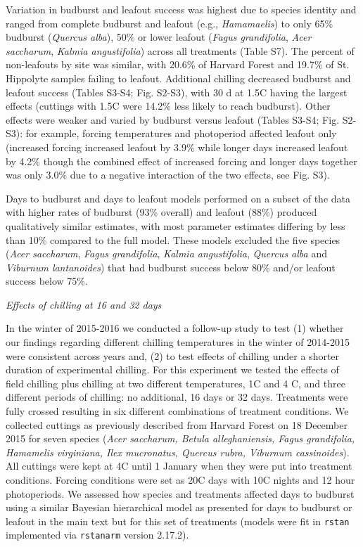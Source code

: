 \documentclass{article}
\begin{document}
\noindent Variation in budburst and leafout success was highest due to species identity and ranged from complete budburst and leafout (e.g., \emph{Hamamaelis}) to only 65\% budburst (\emph{Quercus alba}), 50\% or lower leafout (\emph{Fagus grandifolia}, \emph{Acer saccharum}, \emph{Kalmia angustifolia}) across all treatments (Table S7). The percent of non-leafouts by site was similar, with 20.6\% of Harvard Forest and 19.7\% of St. Hippolyte samples failing to leafout. Additional chilling decreased budburst and leafout success (Tables S3-S4; Fig. S2-S3), with 30 d at 1.5\degree C having the largest effects (cuttings with 1.5\degree C were 14.2\% less likely to reach budburst). Other effects were weaker and varied by budburst versus leafout (Tables S3-S4; Fig. S2-S3): for example, forcing temperatures and photoperiod affected leafout only (increased forcing increased leafout by 3.9\% while longer days increased leafout by 4.2\% though the combined effect of increased forcing and longer days together was only 3.0\% due to a negative interaction of the two effects, see Fig. S3).

\noindent Days to budburst and days to leafout models performed on a subset of the data with higher rates of budburst (93\% overall) and leafout (88\%) produced qualitatively similar estimates, with most parameter estimates differing by less than 10\% compared to the full model. These models excluded the five species (\emph{Acer saccharum}, \emph{Fagus grandifolia}, \emph{Kalmia angustifolia}, \emph{Quercus alba} and \emph{Viburnum lantanoides}) that had budburst success below 80\% and/or leafout success below 75\%.

\noindent\emph{Effects of chilling at 16 and 32 days}

\noindent In the winter of 2015-2016 we conducted a follow-up study to test (1) whether our findings regarding different chilling temperatures in the winter of 2014-2015 were consistent across years and, (2) to test effects of chilling under a shorter duration of experimental chilling. For this experiment we tested the effects of field chilling plus chilling at two different temperatures, 1\degree C and 4 \degree C, and three different periods of chilling: no additional, 16 days or 32 days. Treatments were fully crossed resulting in six different combinations of treatment conditions. We collected cuttings as previously described from Harvard Forest on 18 December 2015 for seven species (\emph{Acer saccharum, Betula alleghaniensis, Fagus grandifolia, Hamamelis virginiana, Ilex mucronatus, Quercus rubra, Viburnum cassinoides}). All cuttings were kept at 4\degree C until 1 January when they were put into treatment conditions. Forcing conditions were set as 20\degree C days with 10\degree C nights and 12 hour photoperiods. We assessed how species and treatments affected days to budburst using a similar Bayesian hierarchical model as presented for days to budburst or leafout in the main text but for this set of treatments (models were fit in \verb|rstan| implemented via  \verb|rstanarm| version 2.17.2). 
\end{document}
